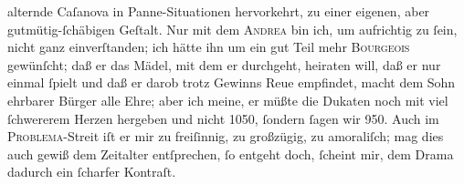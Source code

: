                alternde Caſanova in \strikeout{\textcolor{gray}{geeigne}} Panne-Situationen hervorkehrt, zu  einer
               eigenen, aber gutmütig-ſchäbigen Geſtalt. Nur mit dem \textsc{Andrea} bin ich, um aufrichtig zu{ }ſein, nicht ganz einverſtanden; ich hätte ihn um ein
               gut Teil mehr \textsc{Bourgeois} gewünſcht; daß er das Mädel, mit
               dem er durchgeht, heiraten will, daß er nur einmal{ }ſpielt und daß er darob trotz
               Gewinns Reue empfindet, macht dem Sohn ehrbarer Bürger alle Ehre; aber ich meine, er
               müßte die Dukaten noch mit viel{ }ſchwererem Herzen hergeben und nicht 1050,{ }ſondern{ }ſagen wir 950. Auch im \textsc{Problema}-Streit iſt er mir zu
               freiſinnig, zu großzügig, zu amoraliſch; mag dies auch gewiß dem Zeitalter
               entſprechen,{ }ſo entgeht doch,{ }ſcheint mir, dem Drama dadurch ein{ }ſcharfer Kontraſt.
